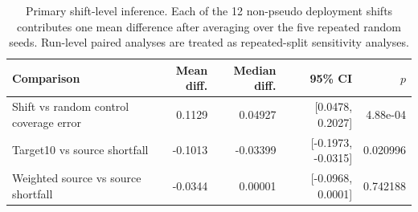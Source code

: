\begin{table}[!tbp]
\centering
\caption{Primary shift-level inference. Each of the 12 non-pseudo deployment shifts contributes one mean difference after averaging over the five repeated random seeds. Run-level paired analyses are treated as repeated-split sensitivity analyses.}
\label{tab:primary_shift_level_inference}
\footnotesize
\setlength{\tabcolsep}{3pt}
\begin{tabularx}{\columnwidth}{@{}Yrrrr@{}}
\toprule
Comparison & Mean diff. & Median diff. & 95\% CI & $p$ \\
\midrule
Shift vs random control coverage error & 0.1129 & 0.04927 & [0.0478, 0.2027] & 4.88e-04 \\
Target10 vs source shortfall & -0.1013 & -0.03399 & [-0.1973, -0.0315] & 0.020996 \\
Weighted source vs source shortfall & -0.0344 & 0.00001 & [-0.0968, 0.0001] & 0.742188 \\
\bottomrule
\end{tabularx}
\end{table}
